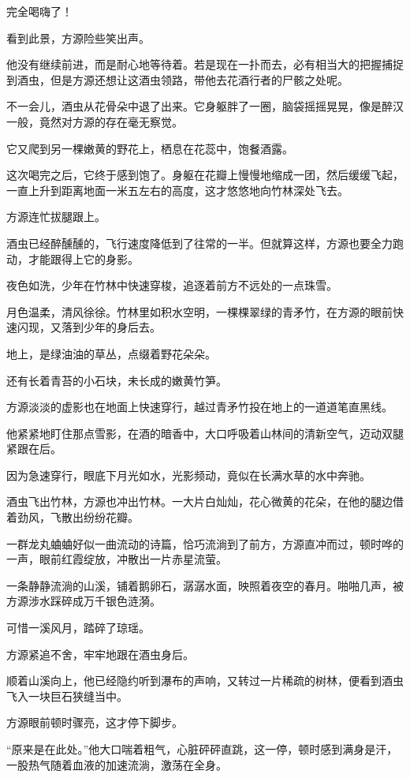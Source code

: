 \begin{this_body}
完全喝嗨了！

看到此景，方源险些笑出声。

他没有继续前进，而是耐心地等待着。若是现在一扑而去，必有相当大的把握捕捉到酒虫，但是方源还想让这酒虫领路，带他去花酒行者的尸骸之处呢。

不一会儿，酒虫从花骨朵中退了出来。它身躯胖了一圈，脑袋摇摇晃晃，像是醉汉一般，竟然对方源的存在毫无察觉。

它又爬到另一棵嫩黄的野花上，栖息在花蕊中，饱餐酒露。

这次喝完之后，它终于感到饱了。身躯在花瓣上慢慢地缩成一团，然后缓缓飞起，一直上升到距离地面一米五左右的高度，这才悠悠地向竹林深处飞去。

方源连忙拔腿跟上。

酒虫已经醉醺醺的，飞行速度降低到了往常的一半。但就算这样，方源也要全力跑动，才能跟得上它的身影。

夜色如洗，少年在竹林中快速穿梭，追逐着前方不远处的一点珠雪。

月色温柔，清风徐徐。竹林里如积水空明，一棵棵翠绿的青矛竹，在方源的眼前快速闪现，又落到少年的身后去。

地上，是绿油油的草丛，点缀着野花朵朵。

还有长着青苔的小石块，未长成的嫩黄竹笋。

方源淡淡的虚影也在地面上快速穿行，越过青矛竹投在地上的一道道笔直黑线。

他紧紧地盯住那点雪影，在酒的暗香中，大口呼吸着山林间的清新空气，迈动双腿紧跟在后。

因为急速穿行，眼底下月光如水，光影频动，竟似在长满水草的水中奔驰。

酒虫飞出竹林，方源也冲出竹林。一大片白灿灿，花心微黄的花朵，在他的腿边借着劲风，飞散出纷纷花瓣。

一群龙丸蛐蛐好似一曲流动的诗篇，恰巧流淌到了前方，方源直冲而过，顿时哗的一声，眼前红霞绽放，冲散出一片赤星流萤。

一条静静流淌的山溪，铺着鹅卵石，潺潺水面，映照着夜空的春月。啪啪几声，被方源涉水踩碎成万千银色涟漪。

可惜一溪风月，踏碎了琼瑶。

方源紧追不舍，牢牢地跟在酒虫身后。

顺着山溪向上，他已经隐约听到瀑布的声响，又转过一片稀疏的树林，便看到酒虫飞入一块巨石狭缝当中。

方源眼前顿时骤亮，这才停下脚步。

“原来是在此处。”他大口喘着粗气，心脏砰砰直跳，这一停，顿时感到满身是汗，一股热气随着血液的加速流淌，激荡在全身。


\end{this_body}
